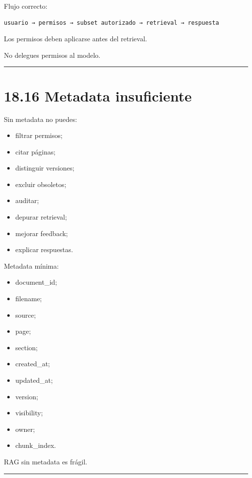 Flujo correcto:

\begin{lstlisting}
usuario → permisos → subset autorizado → retrieval → respuesta
\end{lstlisting}

Los permisos deben aplicarse antes del retrieval.

No delegues permisos al modelo.

\begin{center}\rule{0.5\linewidth}{0.5pt}\end{center}

\section{18.16 Metadata insuficiente}\label{metadata-insuficiente}

Sin metadata no puedes:

\begin{itemize}
\tightlist
\item
  filtrar permisos;
\item
  citar páginas;
\item
  distinguir versiones;
\item
  excluir obsoletos;
\item
  auditar;
\item
  depurar retrieval;
\item
  mejorar feedback;
\item
  explicar respuestas.
\end{itemize}

Metadata mínima:

\begin{itemize}
\tightlist
\item
  document\_id;
\item
  filename;
\item
  source;
\item
  page;
\item
  section;
\item
  created\_at;
\item
  updated\_at;
\item
  version;
\item
  visibility;
\item
  owner;
\item
  chunk\_index.
\end{itemize}

RAG sin metadata es frágil.

\begin{center}\rule{0.5\linewidth}{0.5pt}\end{center}

